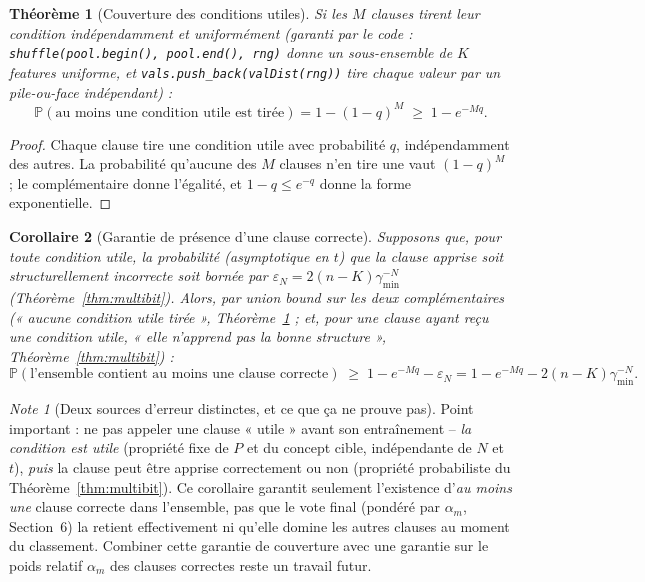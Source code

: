 \documentclass[12pt,a4paper]{article}
\newtheorem{theorem}{Théorème}[section]
\newtheorem{corollary}[theorem]{Corollaire}
\theoremstyle{remark}
\newtheorem{note}{Note}[section]
\begin{document}
\begin{theorem}[Couverture des conditions utiles]\label{thm:coverage}
Si les $M$ clauses tirent leur condition indépendamment et uniformément
(garanti par le code : \texttt{shuffle(pool.begin(), pool.end(), rng)} donne
un sous-ensemble de $K$ features uniforme, et
\texttt{vals.push\_back(valDist(rng))} tire chaque valeur par un
pile-ou-face indépendant) :
\[
  \boxed{\mathbb P(\text{au moins une condition utile est tirée})
  = 1-(1-q)^M \;\ge\; 1-e^{-Mq}.}
\]
\end{theorem}

\begin{proof}
Chaque clause tire une condition utile avec probabilité $q$, indépendamment
des autres. La probabilité qu'aucune des $M$ clauses n'en tire une vaut
$(1-q)^M$ ; le complémentaire donne l'égalité, et $1-q\le e^{-q}$ donne la
forme exponentielle.
\end{proof}

\begin{corollary}[Garantie de présence d'une clause correcte]\label{cor:end-to-end}
Supposons que, pour toute condition utile, la probabilité (asymptotique en
$t$) que la clause apprise soit structurellement incorrecte soit bornée par
$\varepsilon_N=2(n-K)\gamma_{\min}^{-N}$ (Théorème~\ref{thm:multibit}). Alors,
par union bound sur les deux complémentaires (« aucune condition utile
tirée », Théorème~\ref{thm:coverage} ; et, pour une clause ayant reçu une
condition utile, « elle n'apprend pas la bonne structure », Théorème~\ref{thm:multibit}) :
\[
  \mathbb P(\text{l'ensemble contient au moins une clause correcte})
  \;\ge\; 1-e^{-Mq}-\varepsilon_N = 1-e^{-Mq}-2(n-K)\gamma_{\min}^{-N}.
\]
\end{corollary}

\begin{note}[Deux sources d'erreur distinctes, et ce que ça ne prouve pas]
Point important : ne pas appeler une clause « utile » avant son entraînement
-- \emph{la condition est utile} (propriété fixe de $P$ et du concept cible,
indépendante de $N$ et $t$), \emph{puis} la clause peut être apprise
correctement ou non (propriété probabiliste du Théorème~\ref{thm:multibit}).
Ce corollaire garantit seulement l'existence d'\emph{au moins une} clause
correcte dans l'ensemble, pas que le vote final (pondéré par $\alpha_m$,
Section~6) la retient effectivement ni qu'elle domine les autres clauses au
moment du classement. Combiner cette garantie de couverture avec une garantie
sur le poids relatif $\alpha_m$ des clauses correctes reste un travail futur.
\end{note}
\end{document}
